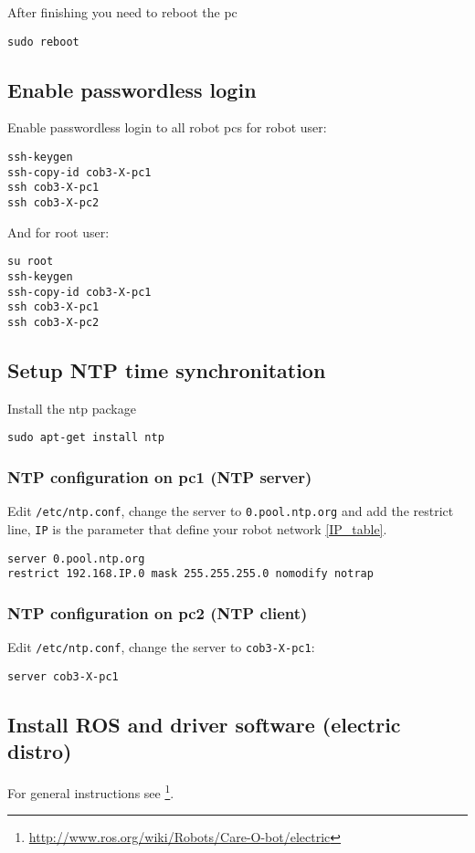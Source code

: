 After finishing you need to reboot the pc

\begin{lstlisting} 
sudo reboot
\end{lstlisting}


\subsection{Enable passwordless login}
Enable passwordless login to all robot pcs for robot user:
\begin{lstlisting}
ssh-keygen
ssh-copy-id cob3-X-pc1
ssh cob3-X-pc1
ssh cob3-X-pc2
\end{lstlisting}
And for root user:
\begin{lstlisting}
su root
ssh-keygen
ssh-copy-id cob3-X-pc1
ssh cob3-X-pc1
ssh cob3-X-pc2
\end{lstlisting}

\subsection{Setup NTP time synchronitation}
Install the ntp package

\begin{lstlisting}
sudo apt-get install ntp
\end{lstlisting}

\subsubsection{NTP configuration on pc1 (NTP server)}
Edit \texttt{/etc/ntp.conf}, change the server to \texttt{0.pool.ntp.org} and add the restrict line, \texttt{IP} is the parameter that define your robot network \ref{IP_table}.

\begin{lstlisting} 
server 0.pool.ntp.org
restrict 192.168.IP.0 mask 255.255.255.0 nomodify notrap
\end{lstlisting}

\subsubsection{NTP configuration on pc2 (NTP client)}
Edit \texttt{/etc/ntp.conf}, change the server to \texttt{cob3-X-pc1}:
\begin{lstlisting}
server cob3-X-pc1
\end{lstlisting}

\subsection{Install ROS and driver software (electric distro)}
For general instructions see \footnote{\url{http://www.ros.org/wiki/Robots/Care-O-bot/electric}}.

